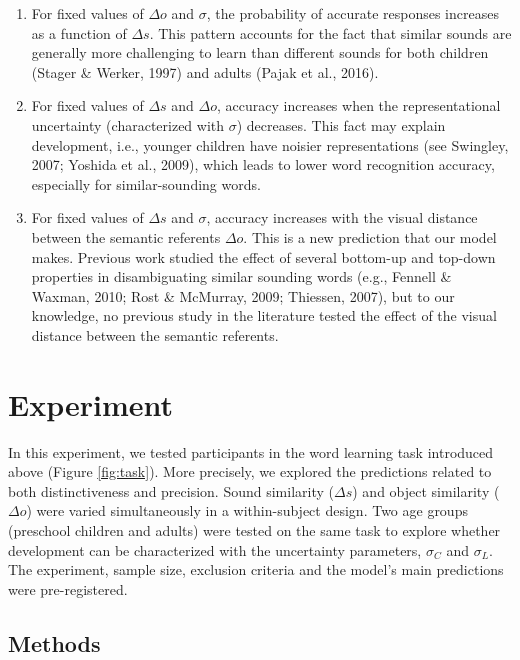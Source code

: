 \documentclass[10pt, letterpaper]{article}
\begin{document}
\begin{enumerate}
\def\labelenumi{\arabic{enumi})}
\item
  For fixed values of \(\Delta o\) and \(\sigma\), the probability of
  accurate responses increases as a function of \(\Delta s\). This
  pattern accounts for the fact that similar sounds are generally more
  challenging to learn than different sounds for both children (Stager
  \& Werker, 1997) and adults (Pajak et al., 2016).
\item
  For fixed values of \(\Delta s\) and \(\Delta o\), accuracy increases
  when the representational uncertainty (characterized with \(\sigma\))
  decreases. This fact may explain development, i.e., younger children
  have noisier representations (see Swingley, 2007; Yoshida et al.,
  2009), which leads to lower word recognition accuracy, especially for
  similar-sounding words.
\item
  For fixed values of \(\Delta s\) and \(\sigma\), accuracy increases
  with the visual distance between the semantic referents \(\Delta o\).
  This is a new prediction that our model makes. Previous work studied
  the effect of several bottom-up and top-down properties in
  disambiguating similar sounding words (e.g., Fennell \& Waxman, 2010;
  Rost \& McMurray, 2009; Thiessen, 2007), but to our knowledge, no
  previous study in the literature tested the effect of the visual
  distance between the semantic referents.
\end{enumerate}

\section{Experiment}\label{experiment}

In this experiment, we tested participants in the word learning task
introduced above (Figure \ref{fig:task}). More precisely, we explored
the predictions related to both distinctiveness and precision. Sound
similarity (\(\Delta s\)) and object similarity (\(\Delta o\)) were
varied simultaneously in a within-subject design. Two age groups
(preschool children and adults) were tested on the same task to explore
whether development can be characterized with the uncertainty
parameters, \(\sigma_C\) and \(\sigma_L\). The experiment, sample size,
exclusion criteria and the model's main predictions were pre-registered.

\subsection{Methods}\label{methods}
\end{document}
